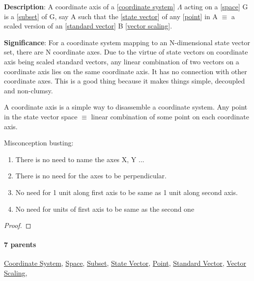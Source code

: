 \documentclass[../main.tex]{subfiles}
\begin{document}
\begin{statement}
\label{statement:Coordinate Axis}\hspace*{0pt}\par
\end{statement}
\textbf{Description}:
A coordinate axis of a [\hyperref[statement:Coordinate System]{coordinate system}] $ \Lambda $ acting on a [\hyperref[statement:Space]{space}] G is a [\hyperref[statement:Subset]{subset}] of G, say A such that the [\hyperref[statement:State Vector]{state vector}] of any [\hyperref[statement:Point]{point}] in A $ \equiv $ a scaled version of an [\hyperref[statement:Standard Vector]{standard vector}] B [\hyperref[statement:Vector Scaling]{vector scaling}].
\par
{\color{magenta} \textbf{Significance}:
For a coordinate system mapping to an N-dimensional state vector set, there are N coordinate axes.
Due to the virtue of state vectors on coordinate axis being scaled standard vectors, any linear combination of two vectors on a coordinate axis lies on the same coordinate axis.
It has no connection with other coordinate axes.
This is a good thing because it makes things simple, decoupled and non-clumsy.

A coordinate axis is a simple way to disassemble a coordinate system.
Any point in the state vector space $ \equiv $ linear combination of some point on each coordinate axis.

Misconception busting:
\begin{enumerate}[nolistsep]
  \item There is no need to name the axes X, Y ...
  \item There is no need for the axes to be perpendicular.
  \item No need for 1 unit along first axis to be same as 1 unit along second axis.
  \item No need for units of first axis to be same as the second one
\end{enumerate}
\par}
\begin{proof}
\proofbydefinition
\end{proof}\par
\paragraph{7 parents} \hyperref[statement:Coordinate System]{Coordinate System}, \hyperref[statement:Space]{Space}, \hyperref[statement:Subset]{Subset}, \hyperref[statement:State Vector]{State Vector}, \hyperref[statement:Point]{Point}, \hyperref[statement:Standard Vector]{Standard Vector}, \hyperref[statement:Vector Scaling]{Vector Scaling}, 
\end{document}
